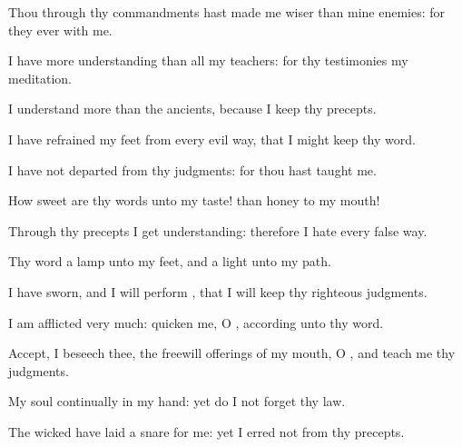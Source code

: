 {\Q {}Thou through thy
commandments hast made me
wiser than mine
enemies: for they
{}
ever with me.


\par }{\Q {}I have more
understanding than all my
teachers: for thy
testimonies
{} my
meditation.


\par }{\Q {}I
understand more than the
ancients, because I
keep thy
precepts.


\par }{\Q {}I have
refrained my
feet from every
evil
way, that I might
keep thy
word.


\par }{\Q {}I have not
departed from thy
judgments: for thou hast
taught me.


\par }{\BB \par }
{\Q {}How
sweet are thy
words unto my
taste!
{} than
honey to my
mouth!


\par }{\Q {}Through thy
precepts I get
understanding: therefore I
hate every
false
way.


\par }{
\par }
{\Q {}Thy
word
{} a
lamp unto my
feet, and a
light unto my
path.


\par }{\Q {}I have
sworn, and I will
perform
{}, that I will
keep thy
righteous
judgments.


\par }{\Q {}I am
afflicted very
much:
quicken me, O
{}, according unto thy
word.


\par }{\Q {}Accept, I beseech thee, the freewill
offerings of my
mouth, O
{}, and
teach me thy
judgments.


\par }{\BB \par }
{\Q {}My
soul
{}
continually in my
hand: yet do I not
forget thy
law.


\par }{\Q {}The
wicked have
laid a
snare for me: yet I
erred not from thy
precepts.


\par }{\BB \par }
